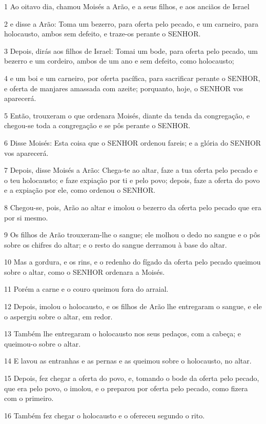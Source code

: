 \par 1 Ao oitavo dia, chamou Moisés a Arão, e a seus filhos, e aos anciãos de Israel
\par 2 e disse a Arão: Toma um bezerro, para oferta pelo pecado, e um carneiro, para holocausto, ambos sem defeito, e traze-os perante o SENHOR.
\par 3 Depois, dirás aos filhos de Israel: Tomai um bode, para oferta pelo pecado, um bezerro e um cordeiro, ambos de um ano e sem defeito, como holocausto;
\par 4 e um boi e um carneiro, por oferta pacífica, para sacrificar perante o SENHOR, e oferta de manjares amassada com azeite; porquanto, hoje, o SENHOR vos aparecerá.
\par 5 Então, trouxeram o que ordenara Moisés, diante da tenda da congregação, e chegou-se toda a congregação e se pôs perante o SENHOR.
\par 6 Disse Moisés: Esta coisa que o SENHOR ordenou fareis; e a glória do SENHOR vos aparecerá.
\par 7 Depois, disse Moisés a Arão: Chega-te ao altar, faze a tua oferta pelo pecado e o teu holocausto; e faze expiação por ti e pelo povo; depois, faze a oferta do povo e a expiação por ele, como ordenou o SENHOR.
\par 8 Chegou-se, pois, Arão ao altar e imolou o bezerro da oferta pelo pecado que era por si mesmo.
\par 9 Os filhos de Arão trouxeram-lhe o sangue; ele molhou o dedo no sangue e o pôs sobre os chifres do altar; e o resto do sangue derramou à base do altar.
\par 10 Mas a gordura, e os rins, e o redenho do fígado da oferta pelo pecado queimou sobre o altar, como o SENHOR ordenara a Moisés.
\par 11 Porém a carne e o couro queimou fora do arraial.
\par 12 Depois, imolou o holocausto, e os filhos de Arão lhe entregaram o sangue, e ele o aspergiu sobre o altar, em redor.
\par 13 Também lhe entregaram o holocausto nos seus pedaços, com a cabeça; e queimou-o sobre o altar.
\par 14 E lavou as entranhas e as pernas e as queimou sobre o holocausto, no altar.
\par 15 Depois, fez chegar a oferta do povo, e, tomando o bode da oferta pelo pecado, que era pelo povo, o imolou, e o preparou por oferta pelo pecado, como fizera com o primeiro.
\par 16 Também fez chegar o holocausto e o ofereceu segundo o rito.

